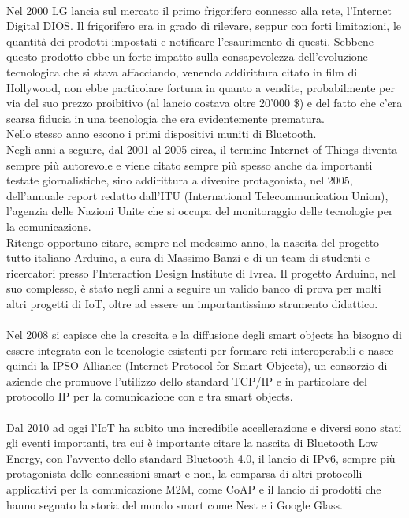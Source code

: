 \\Nel 2000 LG lancia sul mercato il primo frigorifero connesso alla rete, l'Internet Digital DIOS. Il frigorifero era in grado di rilevare, seppur con forti limitazioni, le quantità dei prodotti impostati e notificare l'esaurimento di questi. Sebbene questo prodotto ebbe un forte impatto sulla consapevolezza dell'evoluzione tecnologica che si stava affacciando, venendo addirittura citato in film di Hollywood, non ebbe particolare fortuna in quanto a vendite, probabilmente per via del suo prezzo proibitivo (al lancio costava oltre 20'000 \$) e del fatto che c'era scarsa fiducia in una tecnologia che era evidentemente prematura.
\\Nello stesso anno escono i primi dispositivi muniti di Bluetooth.
\\Negli anni a seguire, dal 2001 al 2005 circa, il termine Internet of Things diventa sempre più autorevole e viene citato sempre più spesso anche da importanti testate giornalistiche, sino addirittura a divenire protagonista, nel 2005, dell'annuale report redatto dall'ITU (International Telecommunication Union), l'agenzia delle Nazioni Unite che si occupa del monitoraggio delle tecnologie per la comunicazione.
\\Ritengo opportuno citare, sempre nel medesimo anno, la nascita del progetto tutto italiano Arduino, a cura di Massimo Banzi e di un team di studenti e ricercatori presso l'Interaction Design Institute di Ivrea. Il progetto Arduino, nel suo complesso, è stato negli anni a seguire un valido banco di prova per molti altri progetti di IoT, oltre ad essere un importantissimo strumento didattico.
\\\\Nel 2008 si capisce che la crescita e la diffusione degli smart objects ha bisogno di essere integrata con le tecnologie esistenti per formare reti interoperabili e nasce quindi la IPSO Alliance (Internet Protocol for Smart Objects), un consorzio di aziende che promuove l'utilizzo dello standard TCP/IP e in particolare del protocollo IP per la comunicazione con e tra smart objects.
\\\\Dal 2010 ad oggi l'IoT ha subito una incredibile accellerazione e diversi sono stati gli eventi importanti, tra cui è importante citare la nascita di Bluetooth Low Energy, con l'avvento dello standard Bluetooth 4.0, il lancio di IPv6, sempre più protagonista delle connessioni smart e non, la comparsa di altri protocolli applicativi per la comunicazione M2M, come CoAP e il lancio di prodotti che hanno segnato la storia del mondo smart come Nest e i Google Glass.


